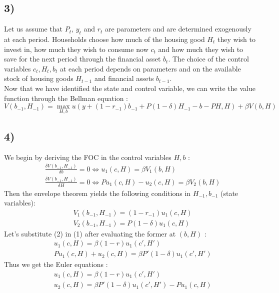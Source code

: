 \documentclass{article}
\begin{document}
\subsection{3)}
Let us assume that $P_t$, $y_t$ and $r_t$ are parameters and are determined exogenously at each period. Households choose how much of the housing good $H_t$ they wish to invest in, how much they wish to consume now $c_t$ and how much they wish to save for the next period through the financial asset $b_t$. The choice of the control variables $c_t,H_t,b_t$ at each period depends on parameters and on the available stock of housing goods $H_{t-1}$ and financial assets $b_{t-1}$.\\
Now that we have identified the state and control variable, we can write the value function through the Bellman equation : 
$$V(b_{-1},H_{-1}) = \max _{H,b}u(y+(1-r_{-1})b_{-1}+P(1-\delta)H_{-1}-b-PH,H) + \beta V(b,H)$$
\subsection{4)}
We begin by deriving the FOC in the control variables $H,b$ :
\begin{equation}\begin{aligned}
    &\frac{\delta V(b_{-1},H_{-1})}{\delta b} = 0 \Longleftrightarrow u_1(c,H) = \beta V_1(b,H)\\
    &\frac{\delta V(b_{-1},H_{-1})}{\delta H} = 0 \Longleftrightarrow Pu_1(c,H) - u_2(c,H) = \beta V_2(b,H)
\end{aligned}\end{equation}
Then the envelope theorem yields the following conditions in $H_{-1}, b_{-1}$ (state variables):
\begin{equation}\begin{aligned}
    &V_1(b_{-1},H_{-1}) = (1-r_{-1})u_1(c,H)\\
    &V_2(b_{-1},H_{-1}) = P(1-\delta)u_1(c,H)
\end{aligned}\end{equation}
Let's substitute (2) in (1) after evaluating the former at $(b,H)$ : 
\begin{equation}\begin{aligned}
    &u_1(c,H)  = \beta (1-r)u_1(c',H')\\
    &Pu_1(c,H) + u_2(c,H) = \beta P'(1-\delta)u_1(c',H')
\end{aligned}\end{equation}
Thus we get the Euler equations : 
\begin{equation}\begin{aligned}
  &u_1(c,H)  = \beta (1-r)u_1(c',H')\\
  &  u_2(c,H) = \beta P'(1-\delta)u_1(c',H') - Pu_1(c,H)
\end{aligned}\end{equation}
\end{document}
